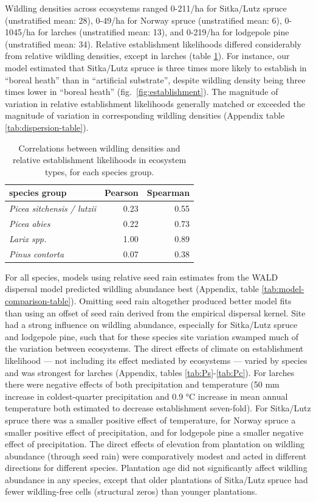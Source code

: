 \documentclass[
]{article}
\begin{document}
Wildling densities across ecosystems ranged 0-211/ha for Sitka/Lutz spruce (unstratified mean: 28), 0-49/ha for Norway spruce (unstratified mean: 6), 0-1045/ha for larches (unstratified mean: 13), and 0-219/ha for lodgepole pine (unstratified mean: 34).
Relative establishment likelihoods differed considerably from relative wildling densities, except in larches (table \ref{tab:estimate-correlation-table}).
For instance, our model estimated that Sitka/Lutz spruce is three times more likely to establish in ``boreal heath'' than in ``artificial substrate'', despite wildling density being three times lower in ``boreal heath'' (fig.~\ref{fig:establishment}).
The magnitude of variation in relative establishment likelihoods generally matched or exceeded the magnitude of variation in corresponding wildling densities (Appendix table \ref{tab:dispersion-table}).

\begin{table}

\caption{\label{tab:estimate-correlation-table}Correlations between wildling densities and relative establishment likelihoods in ecosystem types, for each species group.}
\centering
\begin{tabular}[t]{>{}lrr}
\toprule
species group & Pearson & Spearman\\
\midrule
\em{Picea sitchensis / lutzii} & 0.23 & 0.55\\
\em{Picea abies} & 0.22 & 0.73\\
\em{Larix spp.} & 1.00 & 0.89\\
\em{Pinus contorta} & 0.07 & 0.38\\
\bottomrule
\end{tabular}
\end{table}

For all species, models using relative seed rain estimates from the WALD dispersal model predicted wildling abundance best (Appendix, table \ref{tab:model-comparison-table}).
Omitting seed rain altogether produced better model fits than using an offset of seed rain derived from the empirical dispersal kernel.
Site had a strong influence on wildling abundance, especially for Sitka/Lutz spruce and lodgepole pine, such that for these species site variation swamped much of the variation between ecosystems.
The direct effects of climate on establishment likelihood --- not including its effect mediated by ecosystems --- varied by species and was strongest for larches (Appendix, tables \ref{tab:Ps}-\ref{tab:Pc}).
For larches there were negative effects of both precipitation and temperature (50 mm increase in coldest-quarter precipitation and 0.9 °C increase in mean annual temperature both estimated to decrease establishment seven-fold).
For Sitka/Lutz spruce there was a smaller positive effect of temperature, for Norway spruce a smaller positive effect of precipitation, and for lodgepole pine a smaller negative effect of precipitation.
The direct effects of elevation from plantation on wildling abundance (through seed rain) were comparatively modest and acted in different directions for different species.
Plantation age did not significantly affect wildling abundance in any species, except that older plantations of Sitka/Lutz spruce had fewer wildling-free cells (structural zeros) than younger plantations.
\end{document}
